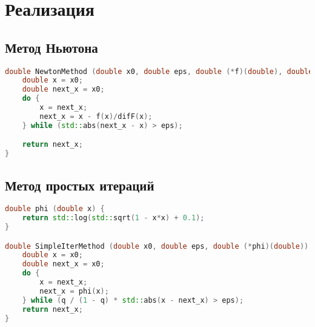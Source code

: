 \section*{Реализация}

\subsection*{Метод Ньютона}

\begin{lstlisting}[language=C++]
double NewtonMethod (double x0, double eps, double (*f)(double), double(*difF)(double)) {
    double x = x0;
    double next_x = x0;
    do {
        x = next_x;
        next_x = x - f(x)/difF(x);
    } while (std::abs(next_x - x) > eps);

    return next_x;
}
\end{lstlisting}

\subsection*{Метод простых итераций}


\begin{lstlisting}[language=C++]
double phi (double x) {
    return std::log(std::sqrt(1 - x*x) + 0.1);
}

double SimpleIterMethod (double x0, double eps, double (*phi)(double)) {
    double x = x0;
    double next_x = x0;
    do {
        x = next_x;
        next_x = phi(x);
    } while (q / (1 - q) * std::abs(x - next_x) > eps);
    return next_x;
}
\end{lstlisting}



\pagebreak